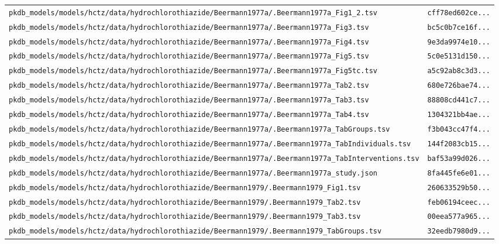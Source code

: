 \begin{longtable}{ll}
\texttt{pkdb\_models/models/hctz/data/hydrochlorothiazide/Beermann1977a/.Beermann1977a\_Fig1\_2.tsv} & \texttt{cff78ed602ce...} \\
\texttt{pkdb\_models/models/hctz/data/hydrochlorothiazide/Beermann1977a/.Beermann1977a\_Fig3.tsv} & \texttt{bc5c0b7ce16f...} \\
\texttt{pkdb\_models/models/hctz/data/hydrochlorothiazide/Beermann1977a/.Beermann1977a\_Fig4.tsv} & \texttt{9e3da9974e10...} \\
\texttt{pkdb\_models/models/hctz/data/hydrochlorothiazide/Beermann1977a/.Beermann1977a\_Fig5.tsv} & \texttt{5c0e5131d150...} \\
\texttt{pkdb\_models/models/hctz/data/hydrochlorothiazide/Beermann1977a/.Beermann1977a\_Fig5tc.tsv} & \texttt{a5c92ab8c3d3...} \\
\texttt{pkdb\_models/models/hctz/data/hydrochlorothiazide/Beermann1977a/.Beermann1977a\_Tab2.tsv} & \texttt{680e726bae74...} \\
\texttt{pkdb\_models/models/hctz/data/hydrochlorothiazide/Beermann1977a/.Beermann1977a\_Tab3.tsv} & \texttt{88808cd441c7...} \\
\texttt{pkdb\_models/models/hctz/data/hydrochlorothiazide/Beermann1977a/.Beermann1977a\_Tab4.tsv} & \texttt{1304321bb4ae...} \\
\texttt{pkdb\_models/models/hctz/data/hydrochlorothiazide/Beermann1977a/.Beermann1977a\_TabGroups.tsv} & \texttt{f3b043cc47f4...} \\
\texttt{pkdb\_models/models/hctz/data/hydrochlorothiazide/Beermann1977a/.Beermann1977a\_TabIndividuals.tsv} & \texttt{144f2083cb15...} \\
\texttt{pkdb\_models/models/hctz/data/hydrochlorothiazide/Beermann1977a/.Beermann1977a\_TabInterventions.tsv} & \texttt{baf53a99d026...} \\
\texttt{pkdb\_models/models/hctz/data/hydrochlorothiazide/Beermann1977a/.Beermann1977a\_study.json} & \texttt{8fa445fe6e01...} \\
\texttt{pkdb\_models/models/hctz/data/hydrochlorothiazide/Beermann1979/.Beermann1979\_Fig1.tsv} & \texttt{260633529b50...} \\
\texttt{pkdb\_models/models/hctz/data/hydrochlorothiazide/Beermann1979/.Beermann1979\_Tab2.tsv} & \texttt{feb06194ceec...} \\
\texttt{pkdb\_models/models/hctz/data/hydrochlorothiazide/Beermann1979/.Beermann1979\_Tab3.tsv} & \texttt{00eea577a965...} \\
\texttt{pkdb\_models/models/hctz/data/hydrochlorothiazide/Beermann1979/.Beermann1979\_TabGroups.tsv} & \texttt{32eedb7980d9...} \\

\end{longtable}
